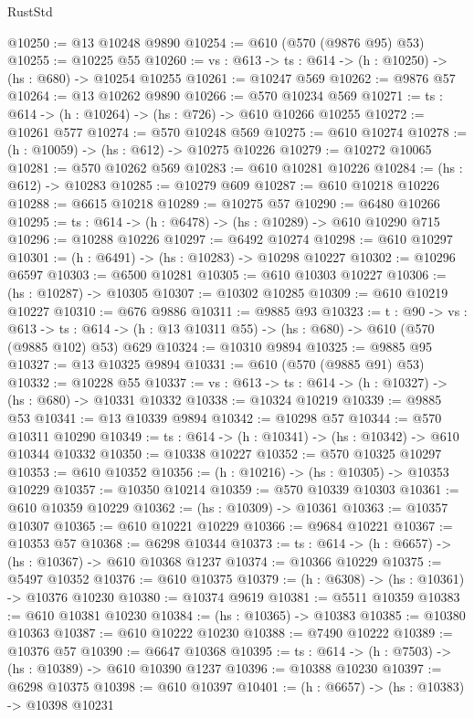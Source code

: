 \begin{lexlean}{RustStd}
\begin{coremodule}
@10250 := @13 @10248 @9890
@10254 := @610 (@570 (@9876 @95) @53)
@10255 := @10225 @55
@10260 := {vs : @613} -> {ts : @614} -> (h : @10250) -> (hs : @680) -> @10254 @10255
@10261 := @10247 @569
@10262 := @9876 @57
@10264 := @13 @10262 @9890
@10266 := @570 @10234 @569
@10271 := {ts : @614} -> (h : @10264) -> (hs : @726) -> @610 @10266 @10255
@10272 := @10261 @577
@10274 := @570 @10248 @569
@10275 := @610 @10274
@10278 := (h : @10059) -> (hs : @612) -> @10275 @10226
@10279 := @10272 @10065
@10281 := @570 @10262 @569
@10283 := @610 @10281 @10226
@10284 := (hs : @612) -> @10283
@10285 := @10279 @609
@10287 := @610 @10218 @10226
@10288 := @6615 @10218
@10289 := @10275 @57
@10290 := @6480 @10266
@10295 := {ts : @614} -> (h : @6478) -> (hs : @10289) -> @610 @10290 @715
@10296 := @10288 @10226
@10297 := @6492 @10274
@10298 := @610 @10297
@10301 := (h : @6491) -> (hs : @10283) -> @10298 @10227
@10302 := @10296 @6597
@10303 := @6500 @10281
@10305 := @610 @10303 @10227
@10306 := (hs : @10287) -> @10305
@10307 := @10302 @10285
@10309 := @610 @10219 @10227
@10310 := @676 @9886
@10311 := @9885 @93
@10323 := {t : @90} ->
  {vs : @613} ->
  {ts : @614} -> (h : @13 @10311 @55) -> (hs : @680) -> @610 (@570 (@9885 @102) @53) @629
@10324 := @10310 @9894
@10325 := @9885 @95
@10327 := @13 @10325 @9894
@10331 := @610 (@570 (@9885 @91) @53)
@10332 := @10228 @55
@10337 := {vs : @613} -> {ts : @614} -> (h : @10327) -> (hs : @680) -> @10331 @10332
@10338 := @10324 @10219
@10339 := @9885 @53
@10341 := @13 @10339 @9894
@10342 := @10298 @57
@10344 := @570 @10311 @10290
@10349 := {ts : @614} -> (h : @10341) -> (hs : @10342) -> @610 @10344 @10332
@10350 := @10338 @10227
@10352 := @570 @10325 @10297
@10353 := @610 @10352
@10356 := (h : @10216) -> (hs : @10305) -> @10353 @10229
@10357 := @10350 @10214
@10359 := @570 @10339 @10303
@10361 := @610 @10359 @10229
@10362 := (hs : @10309) -> @10361
@10363 := @10357 @10307
@10365 := @610 @10221 @10229
@10366 := @9684 @10221
@10367 := @10353 @57
@10368 := @6298 @10344
@10373 := {ts : @614} -> (h : @6657) -> (hs : @10367) -> @610 @10368 @1237
@10374 := @10366 @10229
@10375 := @5497 @10352
@10376 := @610 @10375
@10379 := (h : @6308) -> (hs : @10361) -> @10376 @10230
@10380 := @10374 @9619
@10381 := @5511 @10359
@10383 := @610 @10381 @10230
@10384 := (hs : @10365) -> @10383
@10385 := @10380 @10363
@10387 := @610 @10222 @10230
@10388 := @7490 @10222
@10389 := @10376 @57
@10390 := @6647 @10368
@10395 := {ts : @614} -> (h : @7503) -> (hs : @10389) -> @610 @10390 @1237
@10396 := @10388 @10230
@10397 := @6298 @10375
@10398 := @610 @10397
@10401 := (h : @6657) -> (hs : @10383) -> @10398 @10231

\end{coremodule}
\end{lexlean}
